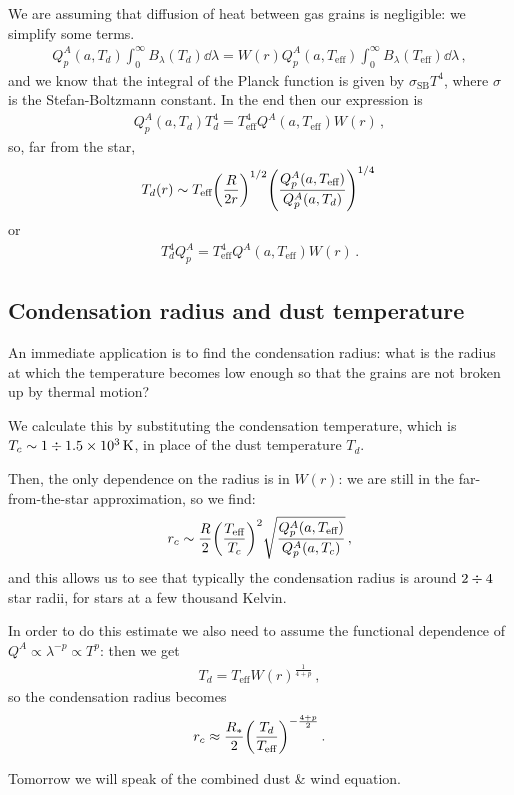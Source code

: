 \documentclass[main.tex]{subfiles}
\begin{document}
We are assuming that diffusion of heat between gas grains is negligible: we simplify some terms. 
%
\begin{align}
  Q_p^{A} (a, T_d ) \int_{0}^{ \infty } B_\lambda(T_d) \dd{\lambda }
  = W(r) Q_p^{A} (a, T _{\text{eff}}) \int_{0}^{ \infty }
  B_\lambda (T _{\text{eff}}) \dd{\lambda }
\,,
\end{align}
%
and we know that the integral of the Planck function is given by \(\sigma _{\text{SB}} T^{4}\), where \(\sigma \) is the Stefan-Boltzmann constant. In the end then our expression is 
%
\begin{align}
  Q_p^{A} (a, T_d) T_d^{4} = T^{4} _{\text{eff}} Q^{A}(a, T _{\text{eff}}) W(r)
\,,
\end{align}
%
so, far from the star,
%
\begin{align}
  T_d(r) \sim T _{\text{eff}} \qty(\frac{R}{2r})^{1/2} \qty(\frac{Q^{A}_{p} (a, T _{\text{eff}})}{Q^{A}_{p} (a,T_{d})})^{1/4}
\,
\end{align}
%
or 
%
\begin{align}
T_d^{4} Q_p^{A} = T _{\text{eff}}^{4} Q^{A} (a, T _{\text{eff}}) W(r)
\,.
\end{align}
%

\subsection{Condensation radius and dust temperature}

An immediate application is to find the condensation radius: what is the radius at which the temperature becomes low enough so that the grains are not broken up by thermal motion? 

We calculate this by substituting the condensation temperature, which is \(T_c \sim 1 \divisionsymbol  \SI{1.5e3}{K} \), in place of the dust temperature \(T_d\).

Then, the only dependence on the radius is in \(W(r)\): we are still in the far-from-the-star approximation, so we find:
%
\begin{align}
r_c \sim \frac{R}{2} \qty(\frac{T _{\text{eff}}}{T_c})^2
\sqrt{\frac{Q^{A}_p (a, T _{\text{eff}})}{Q^{A}_p (a,  T_c)}}
\,,
\end{align}
%
and this allows us to see that typically the condensation radius is around \(2 \divisionsymbol 4\) star radii, for stars at a few thousand Kelvin.

In order to do this estimate we also need to assume the functional dependence of \(Q^{A} \propto \lambda^{-p} \propto T^{p}\): then we get 
%
\begin{align}
T_d = T _{\text{eff}} W(r)^{\frac{1}{4+p}}
\,,
\end{align}
%
so the condensation radius becomes 
%
\begin{align}
r_c \approx \frac{R_*}{2} \qty(\frac{T_d}{T _{\text{eff}}})^{- \frac{4 + p}{2}}
\,.
\end{align}

Tomorrow we will speak of the combined dust \& wind equation. 
\end{document}
